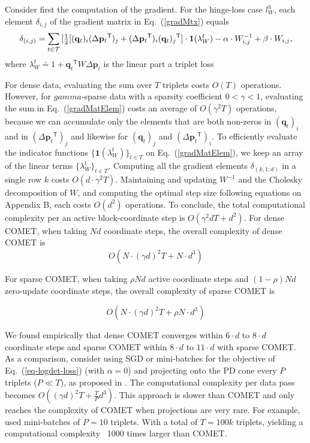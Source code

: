 \documentclass[twoside,11pt]{article}
\newcommand\mat[1]{{#1}}
\renewcommand\vec[1]{\mathbf{#1}}
\newcommand{\T}{{}^\mathsf{T}}
\newcommand{\W}{\mat{W}}
\newcommand{\eqdef}{\doteq}
\newcommand{\q}{{\vec{q}}}
\newcommand{\p}{{\vec{p}}}
\newcommand{\trip}{{t}}
\newcommand{\qt}{{\q_{\trip}}}
\renewcommand{\eqref}[1]{Eq.~(\ref{#1})}
\begin{document}
Consider first the computation of the gradient. For the hinge-loss case $l^{h}_W$, each element $\delta_{i,j}$ of the gradient matrix in \eqref{gradMtx} equals
\begin{equation}
    \delta_{(i,j)} = \sum\limits_{t\in \cal{T}}{ [\tfrac{1}{2}[(\vec{q}_{t})_i(\Delta\vec{p}_{t}\T)_j + (\Delta\vec{p}_{t}\T)_i(\vec{q}_{t})_j\T] } \cdot \textbf{1}(\lambda_{W}^t) - \alpha \cdot \W^{-1}_{i,j} + \beta \cdot \W_{i,j},
\label{gradMatElem}
\end{equation}
where $\lambda_{W}^t \eqdef 1+\qt\T \W \Delta\p_{t}$ is the linear part a triplet loss

For dense data, evaluating the sum over $T$ triplets costs $O(T)$ operations. However, for $gamma$-sparse data with a sparsity coefficient $ 0< \gamma <1 $, evaluating the sum in \eqref{gradMatElem} costs an average of $O(\gamma^2 T)$ operations, because we can accumulate only the elements that are both non-zeros in $(\vec{q}_{t})_i$ and in $(\Delta\vec{p}_{t}\T)_j  $ and likewise for $(\vec{q}_{t})_j$ and $(\Delta\vec{p}_{t}\T)_i$.   To efficiently evaluate the indicator functions $\{ \textbf{1}(\lambda_{W}^t) \}_{t \in T}$ on \eqref{gradMatElem}, we keep an array of the linear terms $\{\lambda_{W}^t\}_{t \in T}$. Computing all the gradient elements $\delta_{(k,1:d)}$ in a single row $k$ costs $O(d\cdot \gamma^2 T)$.
Maintaining and updating $\W^{-1}$ and the Cholesky decomposition of $\W$, and computing the optimal step size following equations on Appendix B, each costs $O(d^2)$ operations. 
To conclude, the total computational complexity per an active block-coordinate step is $O(\gamma^2 d T + d^2)$. 
For dense COMET, when taking $Nd$ coordinate steps, the overall complexity of dense COMET is 
\begin{equation}
O(N \cdot (\gamma d)^2 T + N \cdot d^3)
\label{cometComplexity}
\end{equation}

For sparse COMET, when taking $\rho N d$ active coordinate steps and $(1-\rho) Nd$ zero-update coordinate steps, the overall complexity of sparse COMET is

\begin{equation}
O(N \cdot (\gamma d)^2 T + \rho N \cdot d^3)
\label{spcometComplexity}
\end{equation}

We found empirically that dense COMET converges within $6 \cdot d$ to $8 \cdot d$ coordinate steps and sparse COMET within $8 \cdot d$ to $11 \cdot d$ with sparse COMET. As a comparison, consider using SGD or mini-batches for the objective of \eqref{eq-logdet-loss} (with $
\alpha = 0$) and projecting onto the PD cone every $P$ triplets ($P \ll T$), as proposed in \citep{OASIS,qian}. The computational complexity per data pass becomes $O((\gamma d)^2 T + \frac{T}{P} d^3)$. This approach is slower than COMET and only reaches the complexity of COMET when projections are very rare. For example, \citet{qian} used mini-batches of $P=10$ triplets. With a total of $T=100k$ triplets, yielding a computational complexity ~1000 times larger than COMET.
\end{document}
